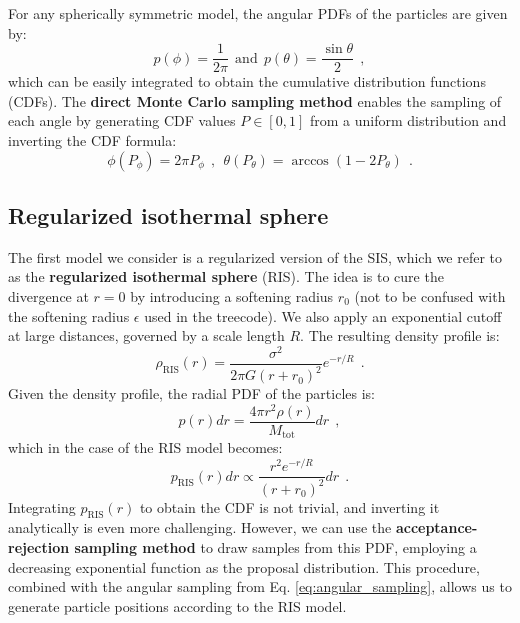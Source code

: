 \documentclass[fleqn,usenatbib]{mnras}
\begin{document}
For any spherically symmetric model, the angular PDFs of the particles are given by:
\begin{equation}
    p(\phi) = \dfrac{1}{2 \pi} \:\: \text{and} \:\: p(\theta) = \dfrac{\sin \theta}{2}  \:\: ,
    \label{eq:angular_pdf}
\end{equation}
which can be easily integrated to obtain the cumulative distribution functions (CDFs).
The \textbf{direct Monte Carlo sampling method} enables the sampling of each angle by generating CDF values $P \in [0,1]$ from a uniform distribution and inverting the CDF formula:
\begin{equation}
    \phi(P_\phi) = 2 \pi P_\phi \:\: , \:\: \theta(P_\theta) = \arccos\left(1 - 2 P_\theta\right) \:\: .
    \label{eq:angular_sampling}
\end{equation}

\subsection{Regularized isothermal sphere}\label{sec:isothermal_sphere}
The first model we consider is a regularized version of the SIS, which we refer to as the \textbf{regularized isothermal sphere} (RIS).
The idea is to cure the divergence at $r=0$ by introducing a softening radius $r_0$ (not to be confused with the softening radius $\epsilon$ used in the treecode).
We also apply an exponential cutoff at large distances, governed by a scale length $R$.
The resulting density profile is:
\begin{equation}
    \rho_\text{RIS}(r) = \dfrac{\sigma^2}{2 \pi G \left(r + r_0\right)^2} e^{-r/R} \:\: .
    \label{eq:ris_density}
\end{equation}
Given the density profile, the radial PDF of the particles is:
\begin{equation}
    p(r)dr = \dfrac{4\pi r^2 \rho(r)}{M_\text{tot}} dr\:\: ,
    \label{eq:radial_pdf}
\end{equation}
which in the case of the RIS model becomes:
\begin{equation}
    p_\text{RIS}(r)dr \propto \dfrac{r^2 e^{-r/R}}{\left(r + r_0\right)^2} dr\:\: .
    \label{eq:ris_pdf}
\end{equation}
Integrating $p_\text{RIS}(r)$ to obtain the CDF is not trivial, and inverting it analytically is even more challenging.
However, we can use the \textbf{acceptance-rejection sampling method} to draw samples from this PDF, employing a decreasing exponential function as the proposal distribution.
This procedure, combined with the angular sampling from Eq. \ref{eq:angular_sampling}, allows us to generate particle positions according to the RIS model.
\vspace{0.5em}
\end{document}

